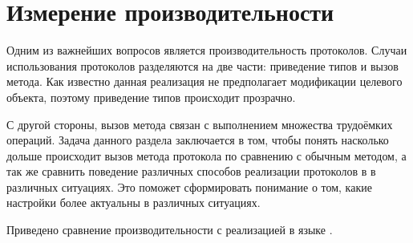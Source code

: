 \section{Измерение производительности} \label{measurements}
Одним из важнейших вопросов является производительность протоколов. Случаи использования протоколов разделяются на две части: приведение типов и вызов метода. Как известно данная реализация не предполагает модификации целевого объекта, поэтому приведение типов происходит прозрачно.

С другой стороны, вызов метода связан с выполнением множества трудоёмких операций. Задача данного раздела заключается в том, чтобы понять насколько дольше происходит вызов метода протокола по сравнению с обычным методом, а так же сравнить поведение различных способов реализации протоколов в  в различных ситуациях. Это поможет сформировать понимание о том, какие настройки более актуальны в различных ситуациях.

Приведено сравнение производительности с реализацией в языке .



